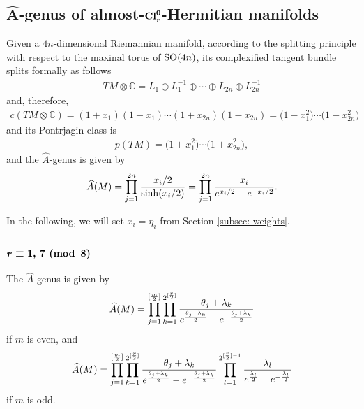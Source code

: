 \documentclass[pdftex]{sigma}
\newcommand{\A}{\mbox{$\widehat A$}}
\numberwithin{equation}{section}
\begin{document}
\subsection[$\widehat A$-genus of almost-${\rm Cl}_r^0$-Hermitian manifolds]{$\boldsymbol{\widehat A}$-genus of almost-$\boldsymbol{{\rm Cl}_r^0}$-Hermitian manifolds}

Given a $4n$-dimensional Riemannian manifold, according to the splitting principle with respect to the maxinal torus of ${\rm SO}(4n)$, its complexif\/ied tangent bundle splits formally as follows
\begin{gather*}TM\otimes \mathbb{C} = L_1\oplus L_1^{-1} \oplus\cdots\oplus L_{2n}\oplus L_{2n}^{-1}\end{gather*}
and, therefore,
\begin{gather*}
c(TM\otimes \mathbb{C}) = (1+x_1)(1-x_1)\cdots(1+x_{2n})(1-x_{2n})= \big(1-x_1^2\big)\cdots\big(1-x_{2n}^2\big)
\end{gather*}
and its Pontrjagin class is
\begin{gather*}
p(TM) = \big(1+x_1^2\big)\cdots \big(1+x_{2n}^2\big),
\end{gather*}
and the \A-genus is given by
\begin{gather*}
\A(M) =\prod_{j=1}^{2n} {x_i/2\over \sinh(x_i/2)} =\prod_{j=1}^{2n} {x_i\over e^{x_i/2}-e^{-x_i/2}}.
\end{gather*}

In the following, we will set $x_i=\eta_i$ from Section \ref{subsec: weights}.

\subsubsection[$r\equiv 1,\,7 \,\,{\rm (mod\,\,\,8)}$]{$\boldsymbol{r\equiv 1,\,7 \,\,{\rm (mod\,\,\,8)}}$}

The \A-genus is given by
\begin{gather*}
\A(M)
=\prod_{j=1}^{[{m\over 2}]}\prod_{k=1}^{2^{[{r\over 2}]}}{\theta_j + \lambda_k\over e^{\theta_j + \lambda_k\over 2}
-e^{-{\theta_j + \lambda_k\over 2}}}
\end{gather*}
if $m$ is even, and
\begin{gather*}
\A(M)
=\prod_{j=1}^{[{m\over 2}]}\prod_{k=1}^{2^{[{r\over 2}]}}{\theta_j + \lambda_k\over e^{\theta_j + \lambda_k\over 2}
-e^{-{\theta_j + \lambda_k\over 2}}}
\prod_{l=1}^{2^{[{r\over 2}]-1}} {\lambda_l\over e^{\lambda_l\over 2}
-e^{-{\lambda_l\over 2}}}
\end{gather*}
if $m$ is odd.
\end{document}

